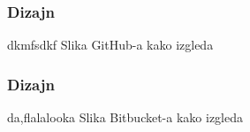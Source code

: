 \documentclass{beamer}
\begin{document}
	\begin{frame}
		\frametitle{Dizajn} %
		dkmfsdkf
		Slika GitHub-a kako izgleda

	\end{frame}

	\begin{frame}
		\frametitle{Dizajn}
		da,flalalooka
		Slika Bitbucket-a kako izgleda


	\end{frame}                           %





	\begin{frame}


	\end{frame}

	\begin{frame}


	\end{frame}

	\begin{frame}


	\end{frame}

	\begin{frame}


	\end{frame}

	\begin{frame}


	\end{frame}

	\begin{frame}


	\end{frame}
\end{document}
